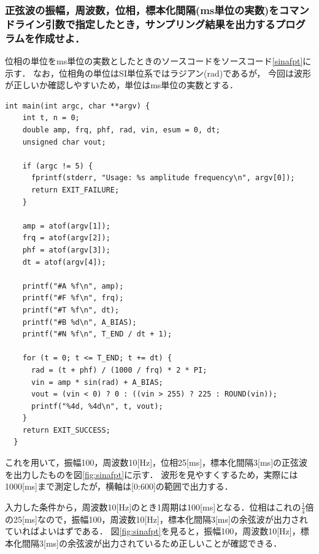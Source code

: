 \documentclass[titlepage]{jarticle}
\begin{document}
\subsubsection{正弦波の振幅，周波数，位相，標本化間隔(ms単位の実数)をコマンドライン引数で指定したとき，サンプリング結果を出力するプログラムを作成せよ．}
位相の単位をms単位の実数としたときのソースコードをソースコード\ref{sinafpt}に示す．
なお，位相角の単位はSI単位系ではラジアン(rad)であるが，
今回は波形が正しいか確認しやすいため，単位はms単位の実数とする．
\begin{lstlisting}[caption=sinafpt.c,label=sinafpt]
  int main(int argc, char **argv) {
    int t, n = 0;
    double amp, frq, phf, rad, vin, esum = 0, dt;
    unsigned char vout;
  
    if (argc != 5) {
      fprintf(stderr, "Usage: %s amplitude frequency\n", argv[0]);
      return EXIT_FAILURE;
    }
  
    amp = atof(argv[1]);
    frq = atof(argv[2]);
    phf = atof(argv[3]);
    dt = atof(argv[4]);

    printf("#A %f\n", amp);
    printf("#F %f\n", frq);
    printf("#T %f\n", dt);
    printf("#B %d\n", A_BIAS);
    printf("#N %f\n", T_END / dt + 1);
  
    for (t = 0; t <= T_END; t += dt) {
      rad = (t + phf) / (1000 / frq) * 2 * PI;
      vin = amp * sin(rad) + A_BIAS;
      vout = (vin < 0) ? 0 : ((vin > 255) ? 225 : ROUND(vin));
      printf("%4d, %4d\n", t, vout);
    }
    return EXIT_SUCCESS;
  }
\end{lstlisting}
これを用いて，振幅100，周波数10[Hz]，位相25[ms]，標本化間隔3[ms]の正弦波を出力したものを図\ref{fig:sinafpt}に示す．
波形を見やすくするため，実際には1000[ms]まで測定したが，横軸は[0:600]の範囲で出力する．

入力した条件から，周波数10[Hz]のとき1周期は100[ms]となる．位相はこれの$\frac{1}{4}$倍の25[ms]なので，振幅100，周波数10[Hz]，標本化間隔3[ms]の余弦波が出力されていればよいはずである．
図\ref{fig:sinafpt}を見ると，振幅100，周波数10[Hz]，標本化間隔3[ms]の余弦波が出力されているため正しいことが確認できる．
\end{document}

